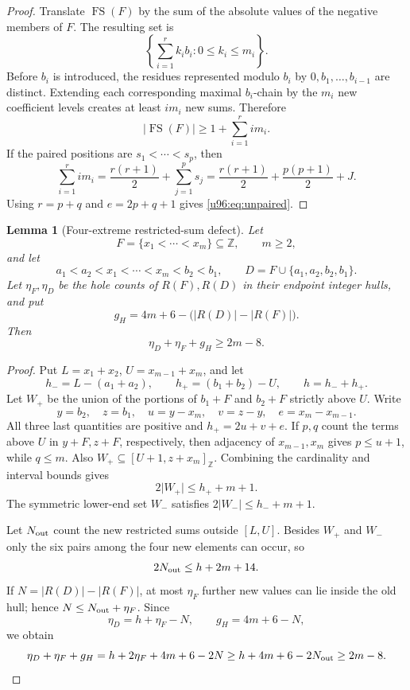 \documentclass[11pt,a4paper]{article}
\newtheorem{lemma}[theorem]{Lemma}
\theoremstyle{remark}
\newcommand{\FS}{\operatorname{FS}}
\newcommand{\card}[1]{\lvert #1\rvert}
\begin{document}
\begin{proof}
Translate $\FS(F)$ by the sum of the absolute values of the negative members
of $F$.  The resulting set is
\[
 \left\{\sum_{i=1}^r k_i b_i:0\leq k_i\leq m_i\right\}.
\]
Before $b_i$ is introduced, the residues represented modulo $b_i$ by
$0,b_1,\ldots,b_{i-1}$ are distinct.  Extending each corresponding maximal
$b_i$-chain by the $m_i$ new coefficient levels creates at least $i m_i$
new sums.  Therefore
\[
 \card{\FS(F)}\geq1+\sum_{i=1}^r i m_i.
\]
If the paired positions are $s_1<\cdots<s_p$, then
\[
 \sum_{i=1}^r i m_i
 =\frac{r(r+1)}2+\sum_{j=1}^p s_j
 =\frac{r(r+1)}2+\frac{p(p+1)}2+J.
\]
Using $r=p+q$ and $e=2p+q+1$ gives \eqref{u96:eq:unpaired}.
\end{proof}

\begin{lemma}[Four-extreme restricted-sum defect]
\label{u96:lem:four-extreme-defect}
Let
\[
 F=\{x_1<\cdots<x_m\}\subseteq\mathbb Z,\qquad m\geq2,
\]
and let
\[
 a_1<a_2<x_1<\cdots<x_m<b_2<b_1,
 \qquad D=F\cup\{a_1,a_2,b_2,b_1\}.
\]
Let $\eta_F,\eta_D$ be the hole counts of $R(F),R(D)$ in their endpoint
integer hulls, and put
\[
 g_H=4m+6-\bigl(\card{R(D)}-\card{R(F)}\bigr).
\]
Then
\begin{equation}
 \boxed{\eta_D+\eta_F+g_H\geq2m-8.}
 \label{u96:eq:four-extreme-defect}
\end{equation}
\end{lemma}

\begin{proof}
Put $L=x_1+x_2$, $U=x_{m-1}+x_m$, and let
\[
 h_-=L-(a_1+a_2),\qquad
 h_+=(b_1+b_2)-U,\qquad h=h_-+h_+.
\]
Let $W_+$ be the union of the portions of $b_1+F$ and $b_2+F$ strictly
above $U$.  Write
\[
 y=b_2,\quad z=b_1,\quad u=y-x_m,\quad v=z-y,
 \quad e=x_m-x_{m-1}.
\]
All three last quantities are positive and $h_+=2u+v+e$.  If $p,q$ count
the terms above $U$ in $y+F,z+F$, respectively, then adjacency of
$x_{m-1},x_m$ gives $p\leq u+1$, while $q\leq m$.  Also
$W_+\subseteq[U+1,z+x_m]_{\mathbb Z}$.  Combining the cardinality and
interval bounds gives
\[
 2\card{W_+}\leq h_++m+1.
\]
The symmetric lower-end set $W_-$ satisfies
$2\card{W_-}\leq h_-+m+1$.

Let $N_{\rm out}$ count the new restricted sums outside $[L,U]$.  Besides
$W_+$ and $W_-$ only the six pairs among the four new elements can occur, so
\[
 2N_{\rm out}\leq h+2m+14.
\]
If $N=\card{R(D)}-\card{R(F)}$, at most $\eta_F$ further new values can lie
inside the old hull; hence $N\leq N_{\rm out}+\eta_F$.  Since
\[
 \eta_D=h+\eta_F-N,
 \qquad g_H=4m+6-N,
\]
we obtain
\[
 \eta_D+\eta_F+g_H
 =h+2\eta_F+4m+6-2N
 \geq h+4m+6-2N_{\rm out}\geq2m-8.
\]
\end{proof}
\end{document}
